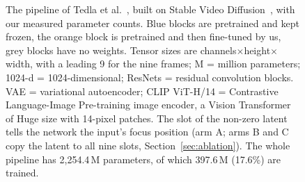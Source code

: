 \documentclass[11pt]{article}
\begin{document}
\begin{figure}[tbp]
{}
\caption{The pipeline of Tedla et al.~\cite{tedla2025refocus}, built on Stable Video Diffusion~\cite{blattmann2023svd}, with our measured parameter counts. Blue blocks are pretrained and kept frozen, the orange block is pretrained and then fine-tuned by us, grey blocks have no weights. Tensor sizes are channels$\times$height$\times$width, with a leading 9 for the nine frames; M = million parameters; 1024-d = 1024-dimensional; ResNets = residual convolution blocks. VAE = variational autoencoder; CLIP ViT-H/14 = Contrastive Language-Image Pre-training image encoder, a Vision Transformer of Huge size with 14-pixel patches. The slot of the non-zero latent tells the network the input's focus position (arm A; arms B and C copy the latent to all nine slots, Section~\ref{sec:ablation}). The whole pipeline has 2{,}254.4\,M parameters, of which 397.6\,M (17.6\%) are trained.}\label{fig:arch}
\end{figure}
\end{document}
